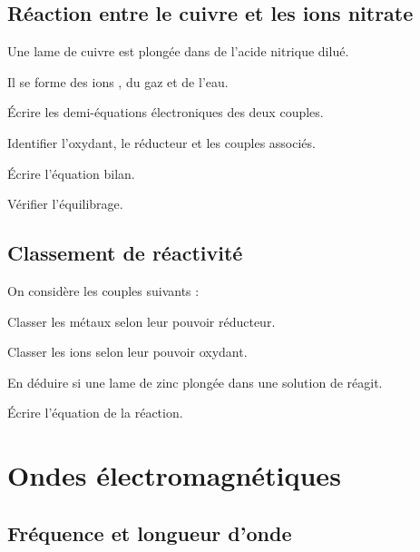 \documentclass[12pt]{article}
\begin{document}
\subsection{Réaction entre le cuivre et les ions nitrate}

\begin{compactitem}
    \item Une lame de cuivre est plongée dans de l’acide nitrique dilué.
    \item Il se forme des ions , du gaz  et de l’eau.
    \item Écrire les demi-équations électroniques des deux couples.
    \item Identifier l’oxydant, le réducteur et les couples associés.
    \item Écrire l’équation bilan.
    \item Vérifier l’équilibrage.
\end{compactitem}

\subsection{Classement de réactivité}

\begin{compactitem}
    \item On considère les couples suivants :
    \begin{compactitem}
        \item {}
        \item {}
        \item {}
    \end{compactitem}
    \item Classer les métaux selon leur pouvoir réducteur.
    \item Classer les ions selon leur pouvoir oxydant.
    \item En déduire si une lame de zinc plongée dans une solution de  réagit.
    \item Écrire l’équation de la réaction.
\end{compactitem}

\section{Ondes électromagnétiques}

\subsection{Fréquence et longueur d’onde}
\end{document}
